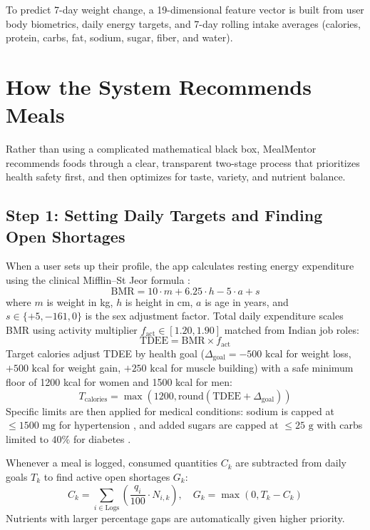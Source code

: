 \documentclass[10pt, conference, letterpaper]{IEEEtran}
\begin{document}
To predict 7-day weight change, a 19-dimensional feature vector is built from user body biometrics, daily energy targets, and 7-day rolling intake averages (calories, protein, carbs, fat, sodium, sugar, fiber, and water).

\section{How the System Recommends Meals}

Rather than using a complicated mathematical black box, MealMentor recommends foods through a clear, transparent two-stage process that prioritizes health safety first, and then optimizes for taste, variety, and nutrient balance.

\subsection{Step 1: Setting Daily Targets and Finding Open Shortages}
When a user sets up their profile, the app calculates resting energy expenditure using the clinical Mifflin--St Jeor formula \cite{mifflin1990}:
\begin{equation}
\text{BMR} = 10 \cdot m + 6.25 \cdot h - 5 \cdot a + s
\label{eq:bmr}
\end{equation}
where $m$ is weight in kg, $h$ is height in cm, $a$ is age in years, and $s \in \{+5, -161, 0\}$ is the sex adjustment factor. Total daily expenditure scales BMR using activity multiplier $f_{\text{act}} \in [1.20, 1.90]$ matched from Indian job roles:
\begin{equation}
\text{TDEE} = \text{BMR} \times f_{\text{act}}
\label{eq:tdee}
\end{equation}
Target calories adjust TDEE by health goal ($\Delta_{\text{goal}} = -500\text{ kcal}$ for weight loss, $+500\text{ kcal}$ for weight gain, $+250\text{ kcal}$ for muscle building) with a safe minimum floor of 1200 kcal for women and 1500 kcal for men:
\begin{equation}
T_{\text{calories}} = \max(1200, \text{round}(\text{TDEE} + \Delta_{\text{goal}}))
\label{eq:cal_target}
\end{equation}
Specific limits are then applied for medical conditions: sodium is capped at $\le 1500\text{ mg}$ for hypertension \cite{whelton2018}, and added sugars are capped at $\le 25\text{ g}$ with carbs limited to $40\%$ for diabetes \cite{who2015}.

Whenever a meal is logged, consumed quantities $C_k$ are subtracted from daily goals $T_k$ to find active open shortages $G_k$:
\begin{equation}
C_k = \sum_{i \in \text{Logs}} \left( \frac{q_i}{100} \cdot N_{i,k} \right), \quad G_k = \max(0, T_k - C_k)
\label{eq:gaps}
\end{equation}
Nutrients with larger percentage gaps are automatically given higher priority.
\end{document}
